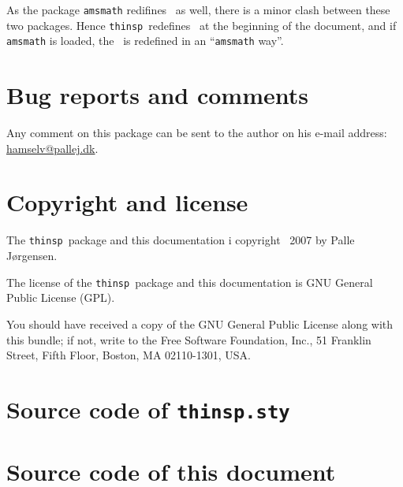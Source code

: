 \documentclass[a4paper,11pt,british]{article}
\def\thinsp{\texttt{thinsp}}
\def\strthinspace{\texttt{\string\thinspace}}
\begin{document}
As the package \texttt{amsmath} redifines \strthinspace\ as well,
there is a minor clash between these two packages. Hence \thinsp\
redefines \strthinspace\ at the beginning of the document, and if
\texttt{amsmath} is loaded, the \strthinspace\ is redefined in an
``\texttt{amsmath} way''.

\section{Bug reports and comments}
\label{sec:bug-reports-comments}

Any comment on this package can be sent to the author on his e-mail
address: \url{hamselv@pallej.dk}.

\section{Copyright and license}
\label{sec:copyright-license}

The \thinsp\ package and this documentation i copyright
\textcopyright\ 2007 by Palle J\o rgensen.

The license of the \thinsp\ package and this documentation is GNU
General Public License (GPL).

You should have received a copy of the GNU General Public License
along with this bundle; if not, write to the Free Software Foundation,
Inc., 51 Franklin Street, Fifth Floor, Boston, MA 02110-1301, USA.

\appendix
\clearpage

\section{Source code of \texttt{thinsp.sty}}
\label{sec:source-code-thinsp.s}



\clearpage

\section{Source code of this document}
\label{sec:source-code-this}


\end{document}

